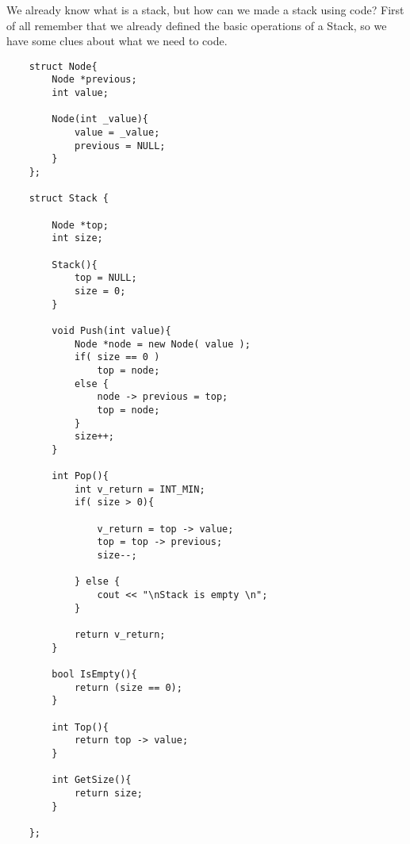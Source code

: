 We already know what is a stack, but how can we made a stack using code? First of all remember that we already defined the basic operations of a Stack, so we have some clues about what we need to code.

\begin{lstlisting}
    struct Node{
        Node *previous;
        int value;

        Node(int _value){
            value = _value;
            previous = NULL;
        }
    };

    struct Stack {

        Node *top;
        int size;

        Stack(){
            top = NULL;
            size = 0;
        }

        void Push(int value){
            Node *node = new Node( value );
            if( size == 0 )
                top = node;
            else {
                node -> previous = top;
                top = node;
            }
            size++;
        }

        int Pop(){
            int v_return = INT_MIN;
            if( size > 0){

                v_return = top -> value;
                top = top -> previous;
                size--;

            } else {
                cout << "\nStack is empty \n";
            } 

            return v_return;
        }

        bool IsEmpty(){
            return (size == 0);
        }

        int Top(){
            return top -> value;
        }

        int GetSize(){
            return size;
        }

    };
\end{lstlisting}